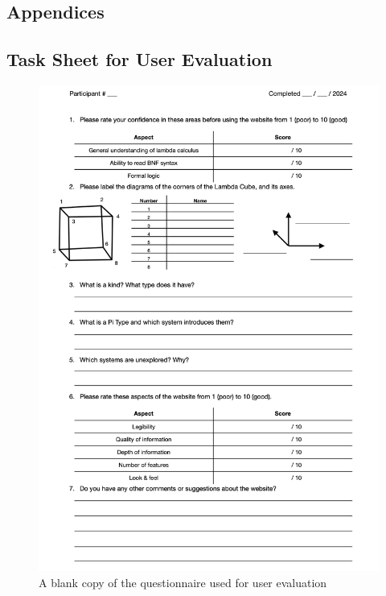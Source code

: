 \documentclass{l4proj}
\begin{document}
\begin{appendices}

\chapter{Appendices}

\section{Task Sheet for User Evaluation}

\begin{figure}[h!]
    \centering
    \includegraphics[width=0.8\linewidth]{dissertation/images/questions.png}
    \caption{A blank copy of the questionnaire used for user evaluation}
    \label{fig:enter-label}
\end{figure}

\end{appendices}


\renewcommand{\thechapter}{0}

\end{document}
